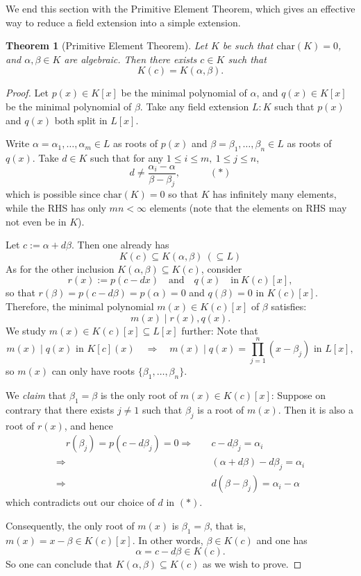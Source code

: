 \documentclass[11pt]{book}
\newtheorem{theorem}{Theorem}[section]
\begin{document}
\medskip
We end this section with the Primitive Element Theorem, which gives an effective way to reduce a field extension into a simple extension.
\begin{theorem}[Primitive Element Theorem] \label{thm-primelt}
    Let $K$ be such that $\mathrm{char}(K) = 0$, and $\alpha, \beta \in K$ are algebraic. Then there exists $c \in K$ such that
    $$K(c) = K(\alpha,\beta).$$
\end{theorem}
\begin{proof}Let \( p(x) \in K[x] \) be the minimal polynomial of \( \alpha  \), and \( q(x) \in K[x] \) be the minimal polynomial of \( \beta \).
Take any field extension \(L: K \) such that \( p(x) \) and \( q(x) \) both split in \( L[x] \). 

Write \( \alpha=\alpha_1, \ldots, \alpha_m \in L \) as roots of \( p(x) \) and \( \beta=\beta_1, \ldots, \beta_n \in L\) as roots of \( q(x) \). Take \( d \in K \) such that for any \( 1 \leq i \leq m,\ 1 \leq j \leq n \), 
\[ d \neq \frac{\alpha_i 
 -\alpha}{\beta - \beta_j},  \quad \quad \quad (*)\]
 which is possible since \( \text{char}(K) = 0 \) so that \( K \) has infinitely many elements, while the RHS has only $mn < \infty$ elements (note that the elements on RHS may not even be in \( K \)).

Let \( c := \alpha + d\beta \). Then one already has
\[ K(c) \subseteq K(\alpha, \beta)\ (\subseteq L) \]
As for the other inclusion \( K(\alpha, \beta) \subseteq K(c) \), consider 
\[ r(x):=p(c - dx) \quad \text{and} \quad q(x)  \quad \text{in}\ K(c)[x], \]
so that $r(\beta) = p(c - d\beta) = p(\alpha) = 0$ and $q(\beta) = 0$ in $K(c)[x]$. Therefore, the minimal polynomial \(m(x)\in K(c)[x]\) of $\beta$ satisfies: 
\[m(x) \mid r(x), q(x).\]
We study \(m(x) \in K(c)[x] \subseteq L[x]\) further: Note that 
\[m(x) \mid q(x) \text{ in } K[c](x) \quad \Rightarrow \quad m(x) \mid q(x) =\prod_{j=1}^n (x- \beta_j) \text{ in } L[x],\]
so \(m(x)\) can only have roots $\{\beta_1, \ldots, \beta_n\}$. 

We {\it claim} that $\beta_1 = \beta$ is the only root of $m(x) \in K(c)[x]$: Suppose on contrary that there exists \(j \neq 1\) such that $\beta_j$ is a root of $m(x)$. Then it is also a root of $r(x)$, and hence
\begin{align*}
    \quad r(\beta_j) = p(c - d\beta_j) = 0 \Rightarrow & \quad c - d\beta_j = \alpha_i \\
\Rightarrow & \quad (\alpha + d\beta) - d\beta_j = \alpha_i \\
\Rightarrow & \quad d(\beta - \beta_j) = \alpha_i - \alpha
\end{align*}
which contradicts out our choice of $d$ in $(*)$. 

Consequently, the only root of $m(x)$ is $\beta_1 = \beta$, that is, \(m(x) = x - \beta \in K(c)[x]\). 
In other words, 
\(\beta \in K(c)\) and one has
\[ \alpha = c - d\beta \in K(c).\]
So one can conclude that \(K(\alpha, \beta) \subseteq K(c)\) as we wish to prove.
\end{proof}
\end{document}
